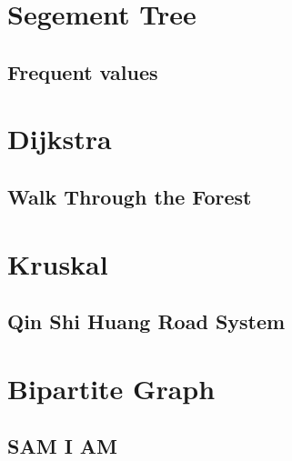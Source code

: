 \section{Segement Tree}
        \subsection{Frequent values}
                

\section{Dijkstra}
%                 
        \subsection{Walk Through the Forest}
                

\section{Kruskal}
        \subsection{Qin Shi Huang Road System}
                

\section{Bipartite Graph}
%                 
%                 
%                 
        \subsection{SAM I AM}
                   
